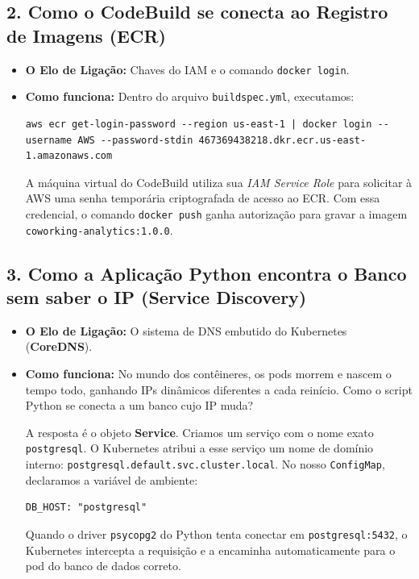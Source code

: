 \documentclass[11pt,a4paper]{article}
\begin{document}
\subsection{2. Como o CodeBuild se conecta ao Registro de Imagens (ECR)}
\begin{itemize}[leftmargin=*]
    \item \textbf{O Elo de Ligação:} Chaves do IAM e o comando \texttt{docker login}.
    \item \textbf{Como funciona:} Dentro do arquivo \texttt{buildspec.yml}, executamos:
    \begin{lstlisting}
aws ecr get-login-password --region us-east-1 | docker login --username AWS --password-stdin 467369438218.dkr.ecr.us-east-1.amazonaws.com
    \end{lstlisting}
    A máquina virtual do CodeBuild utiliza sua \textit{IAM Service Role} para solicitar à AWS uma senha temporária criptografada de acesso ao ECR. Com essa credencial, o comando \texttt{docker push} ganha autorização para gravar a imagem \texttt{coworking-analytics:1.0.0}.
\end{itemize}

\subsection{3. Como a Aplicação Python encontra o Banco sem saber o IP (Service Discovery)}
\begin{itemize}[leftmargin=*]
    \item \textbf{O Elo de Ligação:} O sistema de DNS embutido do Kubernetes (\textbf{CoreDNS}).
    \item \textbf{Como funciona:} No mundo dos contêineres, os pods morrem e nascem o tempo todo, ganhando IPs dinâmicos diferentes a cada reinício. Como o script Python se conecta a um banco cujo IP muda?
    
    A resposta é o objeto \textbf{Service}. Criamos um serviço com o nome exato \texttt{postgresql}. O Kubernetes atribui a esse serviço um nome de domínio interno: \texttt{postgresql.default.svc.cluster.local}. No nosso \texttt{ConfigMap}, declaramos a variável de ambiente:
    \begin{lstlisting}
DB_HOST: "postgresql"
    \end{lstlisting}
    Quando o driver \texttt{psycopg2} do Python tenta conectar em \texttt{postgresql:5432}, o Kubernetes intercepta a requisição e a encaminha automaticamente para o pod do banco de dados correto.
\end{itemize}
\end{document}
